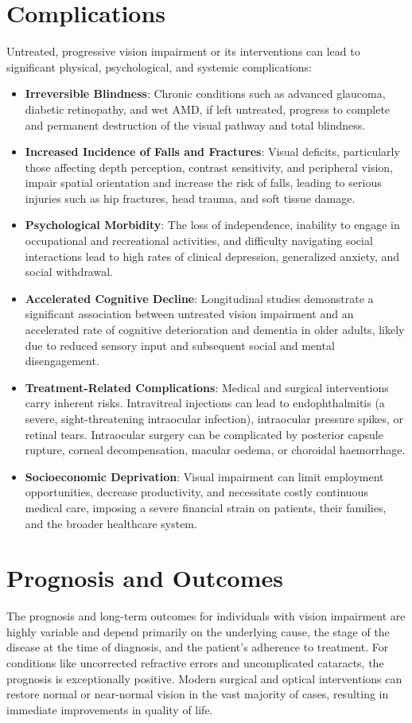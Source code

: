 \section*{Complications}
Untreated, progressive vision impairment or its interventions can lead to significant physical, psychological, and systemic complications:
\begin{itemize}
    \item \textbf{Irreversible Blindness}: Chronic conditions such as advanced glaucoma, diabetic retinopathy, and wet AMD, if left untreated, progress to complete and permanent destruction of the visual pathway and total blindness.
    \item \textbf{Increased Incidence of Falls and Fractures}: Visual deficits, particularly those affecting depth perception, contrast sensitivity, and peripheral vision, impair spatial orientation and increase the risk of falls, leading to serious injuries such as hip fractures, head trauma, and soft tissue damage.
    \item \textbf{Psychological Morbidity}: The loss of independence, inability to engage in occupational and recreational activities, and difficulty navigating social interactions lead to high rates of clinical depression, generalized anxiety, and social withdrawal.
    \item \textbf{Accelerated Cognitive Decline}: Longitudinal studies demonstrate a significant association between untreated vision impairment and an accelerated rate of cognitive deterioration and dementia in older adults, likely due to reduced sensory input and subsequent social and mental disengagement.
    \item \textbf{Treatment-Related Complications}: Medical and surgical interventions carry inherent risks. Intravitreal injections can lead to endophthalmitis (a severe, sight-threatening intraocular infection), intraocular pressure spikes, or retinal tears. Intraocular surgery can be complicated by posterior capsule rupture, corneal decompensation, macular oedema, or choroidal haemorrhage.
    \item \textbf{Socioeconomic Deprivation}: Visual impairment can limit employment opportunities, decrease productivity, and necessitate costly continuous medical care, imposing a severe financial strain on patients, their families, and the broader healthcare system.
\end{itemize}

\section*{Prognosis and Outcomes}
The prognosis and long-term outcomes for individuals with vision impairment are highly variable and depend primarily on the underlying cause, the stage of the disease at the time of diagnosis, and the patient's adherence to treatment. For conditions like uncorrected refractive errors and uncomplicated cataracts, the prognosis is exceptionally positive. Modern surgical and optical interventions can restore normal or near-normal vision in the vast majority of cases, resulting in immediate improvements in quality of life.

